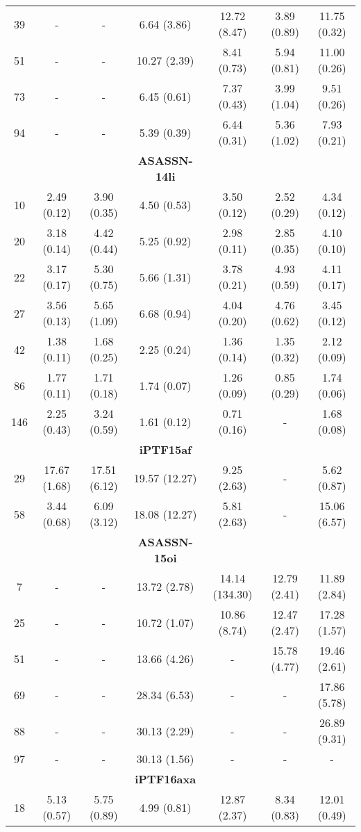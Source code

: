 \documentclass[structabstract]{aa}
\begin{document}
\begin{small}
\begin{longtable}{c c c c c c c}
39	&	-	&	-	&	6.64 (3.86)	&	12.72 (8.47)	&	3.89 (0.89)	&	11.75 (0.32)  \\
51	&	-	&	-	&	10.27 (2.39)	&	8.41 (0.73)	&	5.94 (0.81)	&	11.00 (0.26)  \\
73	&	-	&	-	&	6.45 (0.61)	&	7.37 (0.43)	&	3.99 (1.04)	&	9.51 (0.26)  \\
94	&	-	&	-	&	5.39 (0.39)	&	6.44 (0.31)	&	5.36 (1.02)	&	7.93 (0.21)  \\ \hline
	&		&		&	\textbf{ASASSN-14li}	&		&		&	\\ \hline
10	&	2.49 (0.12)	&	3.90 (0.35)	&	4.50 (0.53)	&	3.50 (0.12)	&	2.52 (0.29)	&	4.34 (0.12)  \\
20	&	3.18 (0.14)	&	4.42 (0.44)	&	5.25 (0.92)	&	2.98 (0.11)	&	2.85 (0.35)	&	4.10 (0.10)  \\
22	&	3.17 (0.17)	&	5.30 (0.75)	&	5.66 (1.31)	&	3.78 (0.21)	&	4.93 (0.59)	&	4.11 (0.17)  \\
27	&	3.56 (0.13)	&	5.65 (1.09)	&	6.68 (0.94)	&	4.04 (0.20)	&	4.76 (0.62)	&	3.45 (0.12)  \\
42	&	1.38 (0.11)	&	1.68 (0.25)	&	2.25 (0.24)	&	1.36 (0.14)	&	1.35 (0.32)	&	2.12 (0.09)  \\
86	&	1.77 (0.11)	&	1.71 (0.18)	&	1.74 (0.07)	&	1.26 (0.09)	&	0.85 (0.29)	&	1.74 (0.06)  \\
146	&	2.25 (0.43)	&	3.24 (0.59)	&	1.61 (0.12)	&	0.71 (0.16)	&	-	&	1.68 (0.08)  \\ \hline
	&		&		&	\textbf{iPTF15af}	&		&		&	\\ \hline
29	&	17.67 (1.68)	&	17.51 (6.12)	&	19.57 (12.27)	&	9.25 (2.63)	&	-	&	5.62 (0.87)  \\
58	&	3.44 (0.68)	&	6.09 (3.12)	&	18.08 (12.27)	&	5.81 (2.63)	&	-	&	15.06 (6.57)  \\ \hline
	&		&		&	\textbf{ASASSN-15oi}	&		&		&	\\ \hline
7	&	-	&	-	&	13.72 (2.78)	&	14.14 (134.30)	&	12.79 (2.41)	&	11.89 (2.84)  \\
25	&	-	&	-	&	10.72 (1.07)	&	10.86 (8.74)	&	12.47 (2.47)	&	17.28 (1.57)  \\
51	&	-	&	-	&	13.66 (4.26)	&	-	&	15.78 (4.77)	&	19.46 (2.61)  \\
69	&	-	&	-	&	28.34 (6.53)	&	-	&	-	&	17.86 (5.78)  \\
88	&	-	&	-	&	30.13 (2.29)	&	-	&	-	&	26.89 (9.31)  \\
97	&	-	&	-	&	30.13 (1.56)	&	-	&	-	&	- \\  \hline
	&		&		&	\textbf{iPTF16axa}	&		&		&	\\ \hline
18	&	5.13 (0.57)	&	5.75 (0.89)	&	4.99 (0.81)	&	12.87 (2.37)	&	8.34 (0.83)	&	12.01 (0.49)  \\

\end{longtable}
\end{small}
\end{document}
